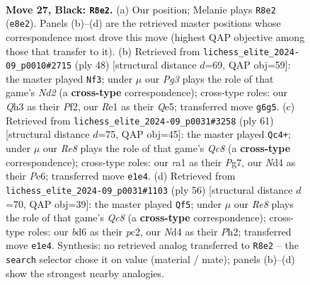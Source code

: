 \documentclass[11pt]{article}
\begin{document}
\clearpage

\begin{figure}[p]\centering
\begin{subfigure}{0.46\textwidth}\centering
\resizebox{\linewidth}{!}{%
\newchessgame
\chessboard[
  setfen={4r1k1/p4p1p/3B2p1/8/3n1P2/P6q/8/R3rQK1 b - - 0 27},
  showmover=false,
  pgfstyle=straightmove, color=movearrow, markmove={e8-e2}
]}
\caption{}
\end{subfigure}\hfill
\begin{subfigure}{0.46\textwidth}\centering
\resizebox{\linewidth}{!}{%
\newchessgame
\chessboard[
  setfen={2b5/1p3rk1/4pq2/3pQ3/8/6P1/2PN1P2/5RK1 w - - 1 25},
  showmover=false,
  pgfstyle=straightmove, color=movearrow, markmove={d2-f3}
]}
\caption{}
\end{subfigure}
\\[4pt]
\begin{subfigure}{0.46\textwidth}\centering
\resizebox{\linewidth}{!}{%
\newchessgame
\chessboard[
  setfen={6k1/6pp/p3pr2/8/P7/6P1/3R1P1P/2q1QK2 b - - 2 31},
  showmover=false,
  pgfstyle=straightmove, color=movearrow, markmove={c1-c4}
]}
\caption{}
\end{subfigure}\hfill
\begin{subfigure}{0.46\textwidth}\centering
\resizebox{\linewidth}{!}{%
\newchessgame
\chessboard[
  setfen={2Q1qk2/5pr1/pp6/2b3p1/2P5/5R2/P1p3PP/5R1K w - - 3 29},
  showmover=false,
  pgfstyle=straightmove, color=movearrow, markmove={c8-f5}
]}
\caption{}
\end{subfigure}
\caption{\textbf{Move 27, Black: \texttt{R8e2}.} (a) Our position; Melanie plays \texttt{R8e2} (\texttt{e8e2}). Panels (b)--(d) are the retrieved master positions whose correspondence most drove this move (highest QAP objective among those that transfer to it). (b) Retrieved from \texttt{lichess\_elite\_2024-09\_p0010\#2715} (ply 48) [structural distance $d$=69, QAP obj=59]: the master played \texttt{Nf3}; under $\mu$ our \emph{Pg3} plays the role of that game's \emph{Nd2} (a \textbf{cross-type} correspondence); cross-type roles: our \emph{Q}h3 as their \emph{P}f2, our \emph{R}e1 as their \emph{Q}e5; transferred move \texttt{g6g5}. (c) Retrieved from \texttt{lichess\_elite\_2024-09\_p0031\#3258} (ply 61) [structural distance $d$=75, QAP obj=45]: the master played \texttt{Qc4+}; under $\mu$ our \emph{Re8} plays the role of that game's \emph{Qc8} (a \textbf{cross-type} correspondence); cross-type roles: our \emph{r}a1 as their \emph{P}g7, our \emph{N}d4 as their \emph{P}e6; transferred move \texttt{e1e4}. (d) Retrieved from \texttt{lichess\_elite\_2024-09\_p0031\#1103} (ply 56) [structural distance $d$=70, QAP obj=39]: the master played \texttt{Qf5}; under $\mu$ our \emph{Re8} plays the role of that game's \emph{Qc8} (a \textbf{cross-type} correspondence); cross-type roles: our \emph{b}d6 as their \emph{p}c2, our \emph{N}d4 as their \emph{P}h2; transferred move \texttt{e1e4}. Synthesis: no retrieved analog transferred to \texttt{R8e2} -- the \texttt{search} selector chose it on value (material / mate); panels (b)--(d) show the strongest nearby analogies.}
\label{fig:thought-m53}
\end{figure}
\end{document}

